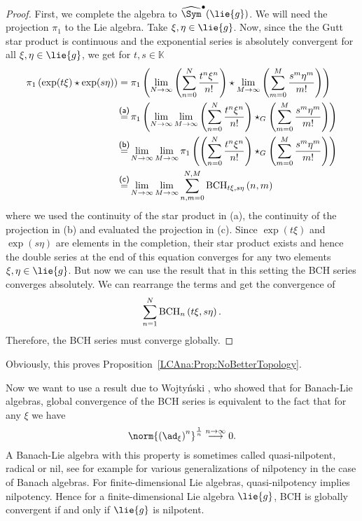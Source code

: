 \begin{proof}
	First, we complete the algebra to $\widehat{\Sym}^{\bullet}(\lie{g})$.
	We will need the projection $\pi_1$ to the Lie algebra. Take 
	$\xi, \eta \in 	\lie{g}$. Now, since the the Gutt star product is 
	continuous and the exponential series is absolutely convergent for 
	all $\xi, \eta \in \lie{g}$, we get for $t, s \in \mathbb{K}$
	\begin{align*}
		\pi_1 \left( \exp(t \xi) \star \exp(s \eta) \right)
		& =
		\pi_1
		\left(
			\lim_{N \rightarrow \infty}
			\left(
				\sum\limits_{n=0}^N
				\frac{t^n \xi^n}{n!}
			\right)
			\star
			\lim_{M \rightarrow \infty}
			\left(
				\sum\limits_{m=0}^M
				\frac{s^m \eta^m}{m!}
			\right)
		\right)
		\\
		& \ot{(a)}{=}
		\pi_1
		\left(
			\lim_{N \rightarrow \infty}
			\lim_{M \rightarrow \infty}
			\left(
				\sum\limits_{n=0}^N
				\frac{t^n \xi^n}{n!}
			\right)
			\star_G
			\left(
				\sum\limits_{m=0}^M
				\frac{s^m \eta^m}{m!}
			\right)
		\right)
		\\
		& \ot{(b)}{=}
		\lim_{N \rightarrow \infty}
		\lim_{M \rightarrow \infty}
		\pi_1
		\left(	
			\left(
				\sum\limits_{n=0}^N
				\frac{t^n \xi^n}{n!}
			\right)
			\star_G
			\left(
				\sum\limits_{m=0}^M
				\frac{s^m \eta^m}{m!}
			\right)
		\right)
		\\
		& \ot{(c)}{=}
		\lim_{N \rightarrow \infty}
		\lim_{M \rightarrow \infty}
		\sum\limits_{n,m=0}^{N, M}
		\bchparts{t \xi}{s \eta}{n}{m}
	\end{align*}
	where we used the continuity of the star product in (a), the continuity of 
	the projection in (b) and evaluated the projection in (c). Since 
	$\exp(t \xi)$ and $\exp(s \eta)$ are elements in the completion, their 
	star product exists and hence the double series at the end of this 
	equation converges for any two elements $\xi, \eta \in \lie{g}$. But now 
	we can use the result that in this setting the BCH series converges 
	absolutely. We can rearrange the terms and get the convergence of
	\begin{equation*}
		\sum\limits_{n = 1}^N
		\mathrm{BCH}_{n}\left(t \xi, s \eta\right).
	\end{equation*}
	Therefore, the BCH series must converge globally.
\end{proof}
Obviously, this proves Proposition~\ref{LCAna:Prop:NoBetterTopology}.


Now we want to use a result due to Wojty\'nski \cite{wojtynski:1998a}, who 
showed that for Banach-Lie algebras, global convergence of the BCH series is 
equivalent to the fact that for any $\xi$ we have
\begin{equation*}
	\norm{ 
		\left( \ad_{\xi} \right)^n 
	}^{\frac{1}{n}}
	\stackrel{n \rightarrow \infty}{\longrightarrow}
	0.
\end{equation*}
A Banach-Lie algebra with this property is sometimes called quasi-nilpotent, 
radical or nil, see for example \cite{mueller:1994a} for various 
generalizations of nilpotency in the case of Banach algebras.
For finite-dimensional Lie algebras, quasi-nilpotency implies nilpotency. 
Hence for a finite-dimensional Lie algebra $\lie{g}$, BCH is globally 
convergent if and only if $\lie{g}$ is nilpotent.


